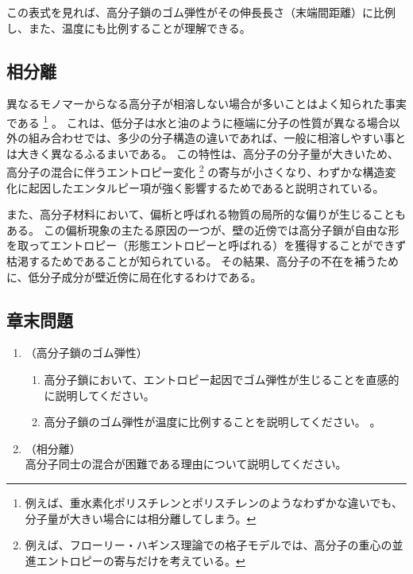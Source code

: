 \documentclass[a4paper,11pt]{ltjsarticle}
\begin{document}
この表式を見れば、高分子鎖のゴム弾性がその伸長長さ（末端間距離）に比例し、また、温度にも比例することが理解できる。


\subsection{相分離}

異なるモノマーからなる高分子が相溶しない場合が多いことはよく知られた事実である
\footnote{
例えば、重水素化ポリスチレンとポリスチレンのようなわずかな違いでも、分子量が大きい場合には相分離してしまう。
}
。
これは、低分子は水と油のように極端に分子の性質が異なる場合以外の組み合わせでは、多少の分子構造の違いであれば、一般に相溶しやすい事とは大きく異なるふるまいである。
この特性は、高分子の分子量が大きいため、高分子の混合に伴うエントロピー変化
\footnote
{
例えば、フローリー・ハギンス理論での格子モデルでは、高分子の重心の並進エントロピーの寄与だけを考えている。
}
の寄与が小さくなり、わずかな構造変化に起因したエンタルピー項が強く影響するためであると説明されている。


また、高分子材料において、偏析と呼ばれる物質の局所的な偏りが生じることもある。
この偏析現象の主たる原因の一つが、壁の近傍では高分子鎖が自由な形を取ってエントロピー（形態エントロピーと呼ばれる）を獲得することができず枯渇するためであることが知られている。
その結果、高分子の不在を補うために、低分子成分が壁近傍に局在化するわけである。

\subsection{章末問題}

	\begin{enumerate}
	\item
	（高分子鎖のゴム弾性）\\
		\vspace{-5mm}
		\begin{enumerate}
		\item
		\label{it:5-1}
		高分子鎖において、エントロピー起因でゴム弾性が生じることを直感的に説明してください。

		\item
		\label{it:5-2}
		高分子鎖のゴム弾性が温度に比例することを説明してください。
。
		\end{enumerate}
	\item
	（相分離）\\
	\label{it:5-3}
	高分子同士の混合が困難である理由について説明してください。

	\end{enumerate}
\end{document}

